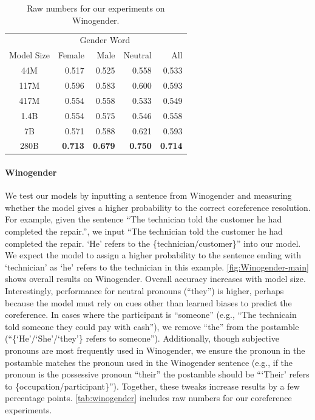 \documentclass[11pt, a4paper, logo, internal, copyright, nonumbering]{deepmind}
\begin{document}
\begin{table}
    \centering
    \begin{tabular}{c|r|r|r|r}
          & \multicolumn{3}{c|}{Gender Word} &  \\
         Model Size & Female & Male & Neutral & All \\
         \midrule
         44M & 0.517 & 0.525 & 0.558 & 0.533\\
         117M & 0.596 & 0.583 & 0.600 & 0.593 \\
         417M & 0.554 & 0.558 & 0.533 & 0.549 \\
         1.4B & 0.554 & 0.575 & 0.546 & 0.558 \\
         7B & 0.571 & 0.588 & 0.621 & 0.593 \\
         280B & \textbf{0.713} & \textbf{0.679} & \textbf{0.750} & \textbf{0.714} \\
         \bottomrule
    \end{tabular}
    \caption{Raw numbers for our experiments on Winogender.}
    \label{tab:winogender}
\end{table}

\paragraph{Winogender}
We test our models by inputting a sentence from Winogender and measuring whether the model gives a higher probability to the correct coreference resolution.  For example, given the sentence ``The technician told the customer he had completed the repair.'', we input ``The technician told the customer he had completed the repair. `He' refers to the \{technician/customer\}'' into our model. We expect the model to assign a higher probability to the sentence ending with `technician' as `he' refers to the technician in this example.
\autoref{fig:Winogender-main} shows overall results on Winogender.
Overall accuracy increases with model size.  Interestingly, performance for neutral pronouns (``they'') is higher, perhaps because the model must rely on cues other than learned biases to predict the coreference.
In cases where the participant is ``someone'' (e.g., ``The technicain told someone they could pay with cash''), we remove ``the'' from the postamble (``\{`He'/`She'/`they'\} refers to someone'').
Additionally, though subjective pronouns are most frequently used in Winogender, we ensure the pronoun in the postamble matches the pronoun used in the Winogender sentence (e.g., if the pronoun is the possessive pronoun ``their'' the postamble should be ```Their' refers to \{occupation/participant\}'').
Together, these tweaks increase results by a few percentage points.
\autoref{tab:winogender} includes raw numbers for our coreference experiments.
\end{document}
